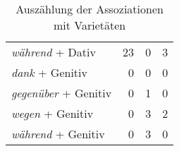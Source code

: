 \begin{table}
\begin{tabular}{lrrr}
\rowcolor[HTML]{C0C0C0} 
\textit{während} + Dativ   & 23 & 0                                                                                                             & 3                                                                                                                                                                                                                                        \\ %
\textit{dank} + Genitiv     & 0 & 0                                                                                                             & 0                                                                                                                                                                                                                                       \\ %
\textit{gegenüber} + Genitiv & 0 & 1                                                                                                             & 0                                                                                                                                                                                                                                        \\ %
\textit{wegen} + Genitiv    & 0 & 3                                                                                                             & 2                                                                                                                                                                                                                                       \\ %
\textit{während} + Genitiv  & 0 & 3                                                                                                             & 0                                                                                                                                                                                                                                        \\ 
\end{tabular}
\caption{Auszählung der Assoziationen mit Varietäten}
\label{table:AssVarietaet}
\end{table}

